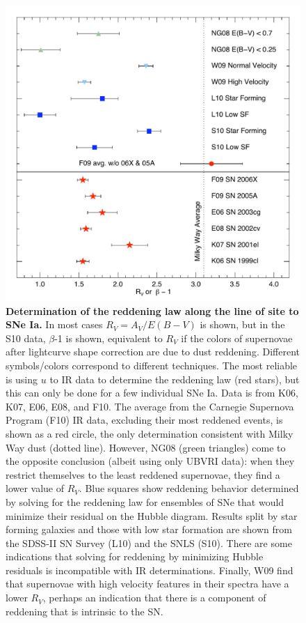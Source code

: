 \documentclass{nature1}
\begin{document}
\begin{figure}
\includegraphics[width=5in]{redfig.pdf} 
\caption{\textsf{{\bf \textsf{Determination of the reddening law along the line of
    site to SNe Ia.}}  In most cases $R_V=A_V/E(B-V)$ is shown, but in
  the S10 data, $\beta$-1 is shown, equivalent to $R_V$ if
  the colors of supernovae after lightcurve shape correction are due
  to dust reddening.  Different symbols/colors correspond to different
  techniques.  The most reliable is using $u$ to IR data to determine
  the reddening law (red stars), but this can only be done for a few
  individual SNe Ia.  Data is from K06\citep{2006AJ....131.1639K},
  K07\citep{2007AJ....133...58K}, E06\citep{2006MNRAS.369.1880E},
  E08\citep{2008MNRAS.384..107E}, and F10\citep{2010AJ....139..120F}.
  The average from the Carnegie Supernova Program (F10) IR data,
  excluding their most reddened events, is shown as a red circle, the
  only determination consistent with Milky Way dust (dotted line).
  However, NG08\citep{2008A&A...487...19N} (green triangles) come to
  the opposite conclusion (albeit using only UBVRI data): when they
  restrict themselves to the least reddened supernovae, they find a
  lower value of $R_V$.  Blue squares show reddening behavior
  determined by solving for the reddening law for ensembles of SNe
  that would minimize their residual on the Hubble diagram.  Results
  split by star forming galaxies and those with low star formation are
  shown from the SDSS-II SN Survey (L10\citep{2010ApJ...722..566L})
  and the SNLS (S10\citep{2010MNRAS.406..782S}).  There are some
  indications that solving for reddening by minimizing Hubble
  residuals is incompatible with IR
  determinations\citep{2010AJ....139..120F}.  Finally,
  W09\citep{2009ApJ...699L.139W} find that supernovae with high
  velocity features in their spectra have a lower $R_V$, perhaps an
  indication that there is a component of reddening that is intrinsic
  to the SN. }}
\label{redfig}
\end{figure}
\end{document}
